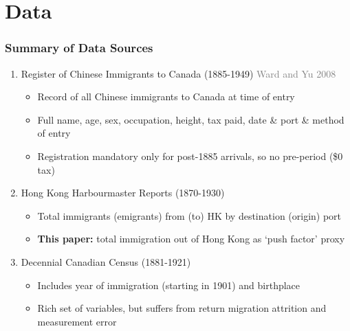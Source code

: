 \documentclass[xcolor=dvipsnames, compress, 12pt, aspectratio=169, handout]{beamer}
\begin{document}
\section{Data}
\begin{frame}
    \label{data}
    \frametitle{Summary of Data Sources}
    \begin{enumerate}
        \item Register of Chinese Immigrants to Canada (1885-1949) \textcolor{gray}{Ward and Yu 2008} 
        \vspace{2mm}
        \begin{itemize}
            \item Record of all Chinese immigrants to Canada at time of entry \hyperlink{fig_register}{}
            \vspace{1mm}
            \item Full name, age, sex, occupation, height, tax paid, date \& port \& method of entry
            \vspace{1mm}
            \item Registration mandatory only for post-1885 arrivals, so no pre-period (\$0 tax)
        \end{itemize}
        \vspace{2mm}
        \item Hong Kong Harbourmaster Reports (1870-1930)
        \begin{itemize}
            \item Total immigrants (emigrants) from (to) HK by destination (origin) port \hyperlink{figa2_imm}{}
            \vspace{1mm}
            \item \textbf{This paper:} total immigration out of Hong Kong as `push factor' proxy
        \end{itemize}
        \vspace{2mm}
        \item Decennial Canadian Census (1881-1921) 
        \vspace{2mm}
        \begin{itemize}
            \item Includes year of immigration (starting in 1901) and birthplace 
            \vspace{1mm}
            \item Rich set of variables, but suffers from return migration attrition and measurement error
        \end{itemize}
    \end{enumerate}
\end{frame}
\end{document}
